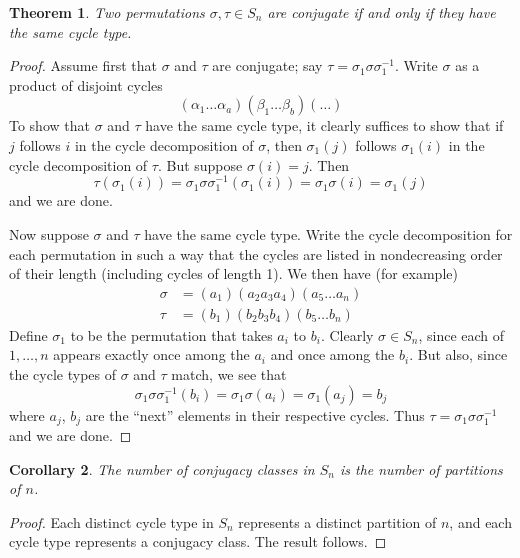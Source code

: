 \documentclass[12pt]{article}
\newtheorem{thm}{Theorem}
\newtheorem{cor}[thm]{Corollary}
\theoremstyle{definition}
\begin{document}
\begin{thm} Two permutations $\sigma, \tau\in S_n$ are conjugate if and only if they have the same cycle type.
\end{thm}
\begin{proof} Assume first that $\sigma$ and $\tau$ are conjugate; say $\tau=\sigma_1\sigma\sigma_1^{-1}$. Write $\sigma$ as a product of disjoint cycles
\[(\alpha_1 \ldots \alpha_a)(\beta_1 \ldots \beta_b)(\ldots)\]
To show that $\sigma$ and $\tau$ have the same cycle type, it clearly suffices to show that if $j$ follows $i$ in the cycle decomposition of $\sigma$, then $\sigma_1(j)$ follows $\sigma_1(i)$ in the cycle decomposition of $\tau$. But suppose $\sigma(i)=j$. Then
\[\tau(\sigma_1(i))=\sigma_1\sigma\sigma_1^{-1}(\sigma_1(i))=\sigma_1\sigma(i)=\sigma_1(j)\]
and we are done.

Now suppose $\sigma$ and $\tau$ have the same cycle type. Write the cycle decomposition for each permutation in such a way that the cycles are listed in nondecreasing order of their length (including cycles of length 1). We then have (for example)
\begin{align*}
\sigma&=(a_1)(a_2 a_3 a_4)(a_5 \ldots a_n)\\
\tau &= (b_1)(b_2 b_3 b_4)(b_5 \ldots b_n)
\end{align*}
Define $\sigma_1$ to be the permutation that takes $a_i$ to $b_i$. Clearly $\sigma\in S_n$, since each of $1,\ldots,n$ appears exactly once among the $a_i$ and once among the $b_i$. But also, since the cycle types of $\sigma$ and $\tau$ match, we see that
\[\sigma_1\sigma\sigma_1^{-1}(b_i) = \sigma_1\sigma(a_i)=\sigma_1(a_j)=b_j\]
where $a_j$, $b_j$ are the "`next"' elements in their respective cycles. Thus $\tau=\sigma_1\sigma\sigma_1^{-1}$ and we are done.
\end{proof}

\begin{cor} The number of conjugacy classes in $S_n$ is the number of partitions of $n$.
\end{cor}
\begin{proof}
Each distinct cycle type in $S_n$ represents a distinct partition of $n$, and each cycle type represents a conjugacy class. The result follows.
\end{proof}
\end{document}
